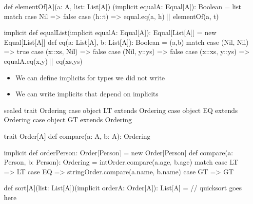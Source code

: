 \documentclass[usenames,dvipsnames,svgnames,table,aspectratio=169,mathserif]{beamer}
\newcommand{\nl}{\vspace{\baselineskip}}
\newcommand{\pnl}{\pause \nl}
\begin{document}
\begin{frame}[fragile]
\begin{scalacode}
def elementOf[A](a: A, list: List[A])
                (implicit equalA: Equal[A]): Boolean = {
  list match {
    case Nil => false
    case (h::t) => equal.eq(a, h) || elementOf(a, t)
  }
}
\end{scalacode}
\end{frame}


\begin{frame}[fragile]
\begin{scalacode}
implicit def equalList(implicit equalA: Equal[A]): Equal[List[A]] =
  new Equal[List[A]] {
    def eq(a: List[A], b: List[A]): Boolean = {
      (a,b) match {
        case (Nil,   Nil)   => true
        case (x::xs, Nil)   => false
        case (Nil,   y::ys) => false
        case (x::xs, y::ys) => equalA.eq(x,y) || eq(xs,ys)
      }
    }
  }
\end{scalacode}
\end{frame}


\begin{frame}
\begin{itemize}
\item We can define implicits for types we did not write
\item We can write implicits that depend on implicits
\end{itemize}
\end{frame}


\begin{frame}[fragile]
\begin{scalacode}
sealed trait Ordering
case object LT extends Ordering
case object EQ extends Ordering
case object GT extends Ordering


trait Order[A] {
  def compare(a: A, b: A): Ordering
}
\end{scalacode}

\pnl

\begin{scalacode}
implicit def orderPerson: Order[Person] = new Order[Person] {
  def compare(a: Person, b: Person): Ordering =
    intOrder.compare(a.age, b.age) match {
      case LT => LT
      case EQ => stringOrder.compare(a.name, b.name)
      case GT => GT
    }
}
\end{scalacode}
\end{frame}


\begin{frame}[fragile]
\begin{scalacode}
def sort[A](list: List[A])(implicit orderA: Order[A]): List[A] = {
  // quicksort goes here
}
\end{scalacode}
\end{frame}
\end{document}
